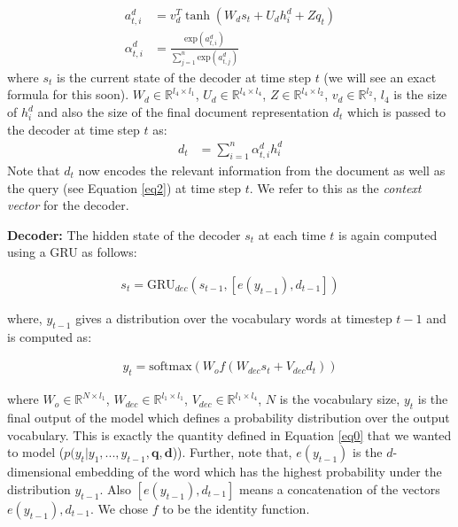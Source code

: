 \documentclass[11pt]{article}
\begin{document}
\begin{align}
\label{eq2}
a_{t,i}^d &= v_d^T \tanh(W_ds_t + U_dh^d_i + Zq_t) \\
\nonumber \alpha_{t,i}^d &= \frac{\text{exp}(a_{t,i}^d)}{\sum_{j=1}^{n} \text{exp}(a_{t,j}^d)}
\end{align}
where $s_t$ is the current state of the decoder at time step $t$ (we will see an exact formula for this soon). $W_{d} \in \mathbb{R}^{l_{4} \times l_{1}}$, $U_d \in \mathbb{R}^{l_{4} \times l_{4}}$, $Z \in \mathbb{R}^{l_{4} \times l_{2}}$, $v_d \in \mathbb{R}^{l_{2}}$, $l_{4}$ is the size of $h_i^d$ and also the size of the final document representation $d_t$ which is passed to the decoder at time step $t$ as:
\begin{align}
\label{eq7}
d_t &= \sum_{i=1}^{n} \alpha_{t,i}^d h_{i}^{d}
\end{align}
Note that $d_t$ now encodes the relevant information from the document as well as the query (see Equation \eqref{eq2}) at time step $t$. We refer to this as the \textit{context vector} for the decoder.

\noindent \textbf{Decoder:} The hidden state of the decoder $s_t$ at each time $t$ is again computed using a GRU as follows:

\begin{align}
\label{eq4}
s_t = \text{GRU}_{dec}(s_{t-1}, [e(y_{t-1}), d_{t-1}])
\end{align}

\noindent where, $y_{t-1}$ gives a distribution over the vocabulary words at timestep $t-1$ and is computed as: 

\begin{align}
\label{eq5}
y_t = \text{softmax}(W_o f(W_{dec}s_t + V_{dec}d_t))
\end{align}

\noindent where $W_o \in \mathbb{R}^{N \times l_{1}}$, $W_{dec} \in \mathbb{R}^{l_{1} \times l_{1}}$, $V_{dec} \in \mathbb{R}^{l_{1} \times l_{4}}$, $N$ is the vocabulary size, $y_t$ is the final output of the model which defines a probability distribution over the output vocabulary. This is exactly the quantity defined in Equation \eqref{eq0} that we wanted to model ($p(y_t| y_1, ..., y_{t-1}, \mathbf{q}, \mathbf{d}$)). Further, note that, $e(y_{t-1})$ is the $d$-dimensional embedding of the word which has the highest probability under the distribution $y_{t-1}$. Also $[e(y_{t-1}), d_{t-1}]$ means a concatenation of the vectors $e(y_{t-1}), d_{t-1}$. We chose $f$ to be the identity function. 
\end{document}
